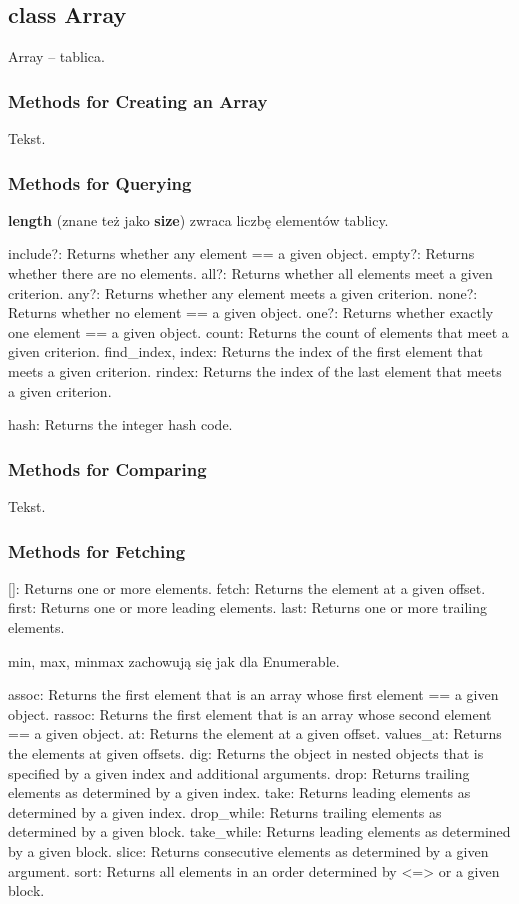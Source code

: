 \subsection{class Array}
Array -- tablica.

\subsubsection{Methods for Creating an Array}
Tekst.

\subsubsection{Methods for Querying}
\textbf{length} (znane też jako \textbf{size}) zwraca liczbę elementów tablicy.


include?: Returns whether any element == a given object.
empty?: Returns whether there are no elements.
all?: Returns whether all elements meet a given criterion.
any?: Returns whether any element meets a given criterion.
none?: Returns whether no element == a given object.
one?: Returns whether exactly one element == a given object.
count: Returns the count of elements that meet a given criterion.
find\_index, index: Returns the index of the first element that meets a given criterion.
rindex: Returns the index of the last element that meets a given criterion.

hash: Returns the integer hash code.
\subsubsection{Methods for Comparing}
Tekst.

\subsubsection{Methods for Fetching}
{\footnotesize
[]: Returns one or more elements.
fetch: Returns the element at a given offset.
first: Returns one or more leading elements.
last: Returns one or more trailing elements.
}

min, max, minmax zachowują się jak dla Enumerable.
    
{\footnotesize
assoc: Returns the first element that is an array whose first element == a given object.
rassoc: Returns the first element that is an array whose second element == a given object.
at: Returns the element at a given offset.
values\_at: Returns the elements at given offsets.
dig: Returns the object in nested objects that is specified by a given index and additional arguments.
drop: Returns trailing elements as determined by a given index.
take: Returns leading elements as determined by a given index.
drop\_while: Returns trailing elements as determined by a given block.
take\_while: Returns leading elements as determined by a given block.
slice: Returns consecutive elements as determined by a given argument.
sort: Returns all elements in an order determined by <=> or a given block.
}

